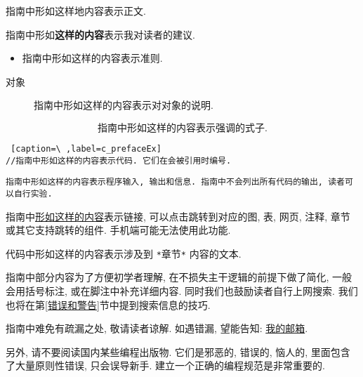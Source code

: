     \vspace*{5pt}
    指南中形如这样地内容表示正文. 

    \vspace*{5pt}
    指南中形如\textbf{这样的内容}表示我对读者的建议.

    \begin{itemize}
        \item 指南中形如这样的内容表示准则.
    \end{itemize}

    \begin{description}
        \item[对象] 指南中形如这样的内容表示对对象的说明. 
    \end{description}

    \vspace*{-20pt}
        \[ \mbox{指南中形如这样的内容表示强调的式子.} \]

\begin{lstlisting} [caption=\ ,label=c_prefaceEx]
//指南中形如这样的内容表示代码. 它们在会被引用时编号.
\end{lstlisting}


\begin{lstlisting}
指南中形如这样的内容表示程序输入, 输出和信息. 指南中不会列出所有代码的输出, 读者可以自行实验.
\end{lstlisting}

    \vspace*{5pt}
    指南中\href{https://www.baidu.com}{形如这样的内容}表示链接, 可以点击跳转到对应的图, 表, 网页, 注释, 章节或其它支持跳转的组件. 手机端可能无法使用此功能.

    \begin{mdframed}[linecolor=darkgray]
        代码中形如这样的内容表示涉及到 \texttt{*}章节\texttt{*} 内容的文本.
    \end{mdframed}

    指南中部分内容为了方便初学者理解, 在不损失主干逻辑的前提下做了简化, 一般会用括号标注, 或在脚注中补充详细内容. 同时我们也鼓励读者自行上网搜索. 我们也将在第\ref{错误和警告}节中提到搜索信息的技巧.

    指南中难免有疏漏之处, 敬请读者谅解. 如遇错漏, 望能告知: \href{mailto: wutong.tony@foxmail.com}{我的邮箱}.

    另外, 请不要阅读国内某些编程出版物. 它们是邪恶的, 错误的, 恼人的, 里面包含了大量原则性错误, 只会误导新手. 建立一个正确的编程规范是非常重要的.